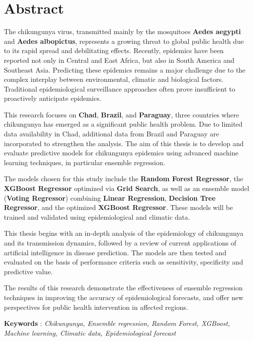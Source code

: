\chapter*{Abstract}

\renewcommand{\abstractnamefont}{\normalfont\Large\bfseries}

\hskip7mm
%

\begin{spacing}{1.3}
	
The chikungunya virus, transmitted mainly by the mosquitoes \textbf{Aedes aegypti} and \textbf{Aedes albopictus}, represents a growing threat to global public health due to its rapid spread and debilitating effects. Recently, epidemics have been reported not only in Central and East Africa, but also in South America and Southeast Asia. Predicting these epidemics remains a major challenge due to the complex interplay between environmental, climatic and biological factors. Traditional epidemiological surveillance approaches often prove insufficient to proactively anticipate epidemics.

This research focuses on \textbf{Chad}, \textbf{Brazil}, and \textbf{Paraguay}, three countries where chikungunya has emerged as a significant public health problem. Due to limited data availability in Chad, additional data from Brazil and Paraguay are incorporated to strengthen the analysis. The aim of this thesis is to develop and evaluate predictive models for chikungunya epidemics using advanced machine learning techniques, in particular ensemble regression.

The models chosen for this study include the \textbf{Random Forest Regressor}, the \textbf{XGBoost Regressor} optimized via \textbf{Grid Search}, as well as an ensemble model (\textbf{Voting Regressor}) combining \textbf{Linear Regression}, \textbf{Decision Tree Regressor}, and the optimized \textbf{XGBoost Regressor}. These models will be trained and validated using epidemiological and climatic data.

This thesis begins with an in-depth analysis of the epidemiology of chikungunya and its transmission dynamics, followed by a review of current applications of artificial intelligence in disease prediction. The models are then tested and evaluated on the basis of performance criteria such as sensitivity, specificity and predictive value.

The results of this research demonstrate the effectiveness of ensemble regression techniques in improving the accuracy of epidemiological forecasts, and offer new perspectives for public health intervention in affected regions.

\textbf{Keywords} : \textit{Chikungunya, Ensemble regression, Random Forest, XGBoost, Machine learning, Climatic data, Epidemiological forecast}

\end{spacing}
